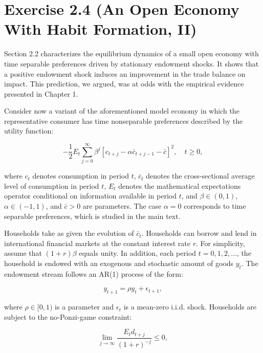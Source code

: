\documentclass{article}
\begin{document}
\section*{Exercise 2.4 (An Open Economy With Habit Formation, II)}

Section 2.2 characterizes the equilibrium dynamics of a small open economy with time separable preferences driven by stationary endowment shocks. It shows that a positive endowment shock induces an improvement in the trade balance on impact. This prediction, we argued, was at odds with the empirical evidence presented in Chapter 1. 

Consider now a variant of the aforementioned model economy in which the representative consumer has time nonseparable preferences described by the utility function:

\begin{equation}
    -\frac{1}{2} E_t \sum_{j=0}^{\infty} \beta^j [ c_{t+j} - \alpha \bar{c}_{t+j-1} - \bar{c}]^2, \quad t \geq 0,
\end{equation}

where $c_t$ denotes consumption in period $t$, $\bar{c}_t$ denotes the cross-sectional average level of consumption in period $t$, $E_t$ denotes the mathematical expectations operator conditional on information available in period $t$, and $\beta \in (0,1)$, $\alpha \in (-1,1)$, and $\bar{c} > 0$ are parameters. The case $\alpha = 0$ corresponds to time separable preferences, which is studied in the main text. 

Households take as given the evolution of $\bar{c}_t$. Households can borrow and lend in international financial markets at the constant interest rate $r$. For simplicity, assume that $(1+r)\beta$ equals unity. In addition, each period $t = 0,1,2,\dots$, the household is endowed with an exogenous and stochastic amount of goods $y_t$. The endowment stream follows an AR(1) process of the form:

\begin{equation}
    y_{t+1} = \rho y_t + \epsilon_{t+1},
\end{equation}

where $\rho \in [0,1)$ is a parameter and $\epsilon_t$ is a mean-zero i.i.d. shock. Households are subject to the no-Ponzi-game constraint:

\begin{equation}
    \lim_{j \to \infty} \frac{E_t d_{t+j}} {(1+r)^{-j}} \leq 0,
\end{equation}
\end{document}

